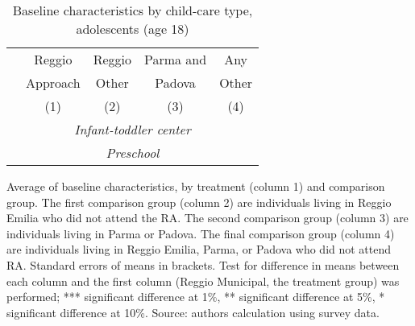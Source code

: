 \begin{table}[H]
\caption{Baseline characteristics by child-care type, adolescents (age 18)}
\label{tab:adol_CONTROLasilo}
\centering
\begin{adjustbox}{width=0.65\textwidth,center=\textwidth}
\small
\begin{tabular}{l cccc}
\hline \hline 
 & Reggio & Reggio & Parma and & Any \\
 & Approach & Other & Padova & Other \\
 &   (1)    &  (2)  & (3)    &  (4) \\
%
\hline 
\multicolumn{5}{c}{\textit{Infant-toddler center}} \\
\hline 
%

%
\hline 
\multicolumn{5}{c}{\textit{Preschool}} \\
\hline 
%

\hline
\end{tabular}
\end{adjustbox}
 \vspace{1ex}

 \raggedright{
 \tiny{Average of baseline characteristics, by treatment (column 1) and comparison group.
 The first comparison group (column 2) are individuals living in Reggio Emilia who did not attend the RA. The second comparison group (column 3) are individuals living in Parma or Padova. The final comparison group (column 4) are individuals living in Reggio Emilia, Parma, or Padova who did not attend RA.
 Standard errors of means in brackets. Test for difference in means between each column and the first column (Reggio Municipal, the treatment group) was performed; *** significant difference at 1\%, ** significant difference at 5\%, * significant difference at 10\%. Source: authors calculation using survey data.}
 }
\end{table}

